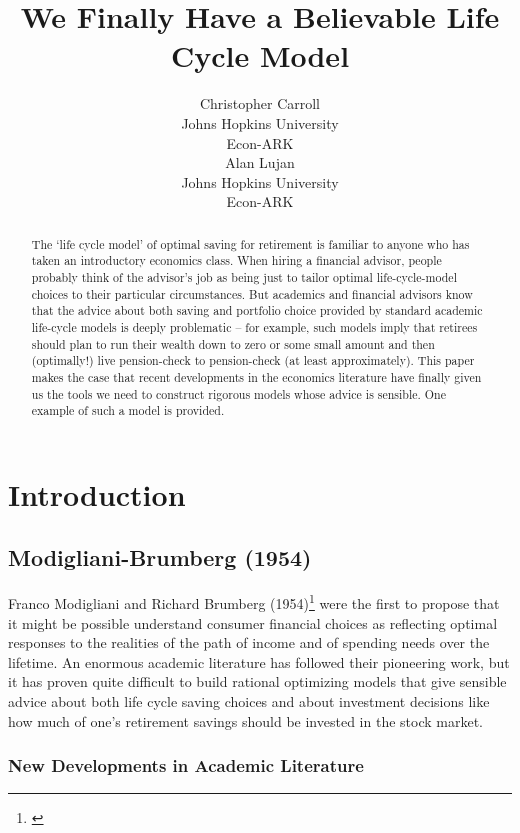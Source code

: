 \documentclass{article}
\title{We Finally Have a Believable Life Cycle Model}
\date{\displaydate{articleDate}}
\author{Christopher Carroll\footnotemark[1]\\
Johns Hopkins University\\Econ-ARK\\\AND
Alan Lujan\\
Johns Hopkins University\\Econ-ARK\\}
\begin{document}
\maketitle
{}

\begin{abstract}
The `life cycle model' of optimal saving for retirement is familiar to anyone who has taken an introductory economics class. When hiring a financial advisor, people probably think of the advisor's job as being just to tailor optimal life-cycle-model choices to their particular circumstances. But academics and financial advisors know that the advice about both saving and portfolio choice provided by standard academic life-cycle models is deeply problematic -- for example, such models imply that retirees should plan to run their wealth down to zero or some small amount and then (optimally!) live pension-check to pension-check (at least approximately). This paper makes the case that recent developments in the economics literature have finally given us the tools we need to construct rigorous models whose advice is sensible. One example of such a model is provided.
\end{abstract}

\keywords{}

\section{Introduction}


\subsection{Modigliani-Brumberg (1954)}

Franco Modigliani and Richard Brumberg (1954)\footnote{\cite{2005}} were the first to propose that it might be possible understand consumer financial choices as reflecting optimal responses to the realities of the path of income and of spending needs over the lifetime. An enormous academic literature has followed their pioneering work, but it has proven quite difficult to build rational optimizing models that give sensible advice about both life cycle saving choices and about investment decisions like how much of one's retirement savings should be invested in the stock market.


\subsubsection{New Developments in Academic Literature}
\end{document}
